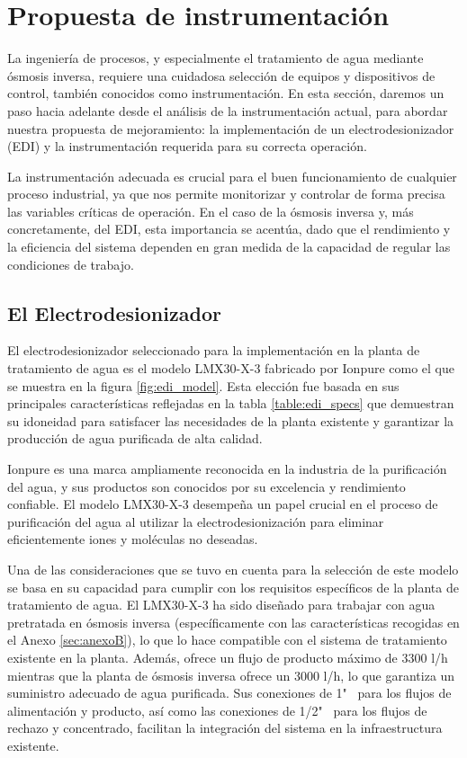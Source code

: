 \section{Propuesta de instrumentación}

La ingeniería de procesos, y especialmente el tratamiento de agua mediante ósmosis inversa, requiere una cuidadosa selección de equipos y dispositivos de control, también conocidos como instrumentación. En esta sección, daremos un paso hacia adelante desde el análisis de la instrumentación actual, para abordar nuestra propuesta de mejoramiento: la implementación de un electrodesionizador (EDI) y la instrumentación requerida para su correcta operación.

La instrumentación adecuada es crucial para el buen funcionamiento de cualquier proceso industrial, ya que nos permite monitorizar y controlar de forma precisa las variables críticas de operación. En el caso de la ósmosis inversa y, más concretamente, del EDI, esta importancia se acentúa, dado que el rendimiento y la eficiencia del sistema dependen en gran medida de la capacidad de regular las condiciones de trabajo.

\subsection{El Electrodesionizador}

El electrodesionizador seleccionado para la implementación en la planta de tratamiento
de agua es el modelo LMX30-X-3 fabricado por Ionpure como el que se muestra en la
figura \ref{fig:edi_model}. Esta elección fue basada en sus principales características
reflejadas en la tabla \ref{table:edi_specs} que
demuestran su idoneidad para satisfacer las necesidades de la planta existente y
garantizar la producción de agua purificada de alta calidad.


Ionpure es una marca ampliamente reconocida en la industria de la purificación del agua,
y sus productos son conocidos por su excelencia y rendimiento confiable.
El modelo LMX30-X-3 desempeña un papel crucial en el proceso de purificación
del agua al utilizar la electrodesionización para eliminar eficientemente iones y
moléculas no deseadas.

Una de las consideraciones que se tuvo en cuenta para la selección de este modelo
se basa en su capacidad para cumplir con los
requisitos específicos de la planta de tratamiento de agua. El LMX30-X-3 ha
sido diseñado para trabajar con agua pretratada en ósmosis inversa 
(específicamente con las características recogidas en el Anexo \ref{sec:anexoB}), lo que lo
hace compatible con el sistema de tratamiento existente en la planta. Además,
ofrece un flujo de producto máximo de 3300 l/h mientras que la
planta de ósmosis inversa ofrece un 3000 l/h, lo que garantiza un suministro
adecuado de agua purificada.
Sus conexiones de 1" \ para los flujos de alimentación y producto, así como las
conexiones de 1/2" \ para los flujos de rechazo y concentrado, facilitan la
integración del sistema en la infraestructura existente.


